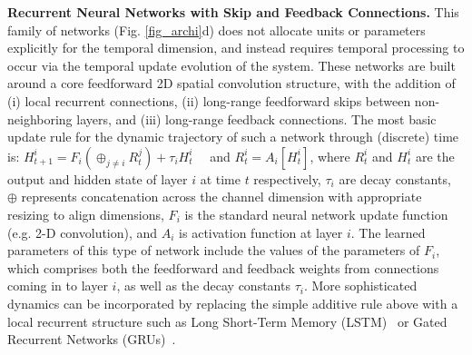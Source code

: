 \textbf{Recurrent Neural Networks with Skip and Feedback Connections.} This family of networks (Fig. \ref{fig_archi}d) does not allocate units or parameters explicitly for the temporal dimension, and instead requires temporal processing to occur via the temporal update evolution of the system.  These networks are built around a core feedforward 2D spatial convolution structure, with the addition of (i) local recurrent connections, (ii) long-range feedforward skips between non-neighboring layers, and (iii) long-range feedback connections.  
The most basic update rule for the dynamic trajectory of such a network through (discrete) time is: 
$H^i_{t+1} = F_i \left ( \oplus_{j \neq i} R^j_t \right )  + \tau_i H^i_t \quad$ and $R^i_t = A_i[H^i_t]$, where $R^i_t$ and $H^i_t$ are the output and hidden state of layer $i$ at time $t$ respectively,  $\tau_i$  are decay constants, $\oplus$ represents concatenation across the channel dimension with appropriate resizing to align dimensions, $F_i$ is the standard neural network update function (e.g. 2-D convolution), and $A_i$ is activation function at layer $i$.  
The learned parameters of this type of network include the values of the parameters of $F_i$, which comprises both the feedforward and feedback weights from connections coming in to layer $i$, as well as the decay constants $\tau_i$. 
More sophisticated dynamics can be incorporated by replacing the simple additive rule above with a local recurrent structure such as Long Short-Term Memory (LSTM)~\cite{Hochreiter1997} or Gated Recurrent Networks (GRUs)~\cite{cho2014properties}.


